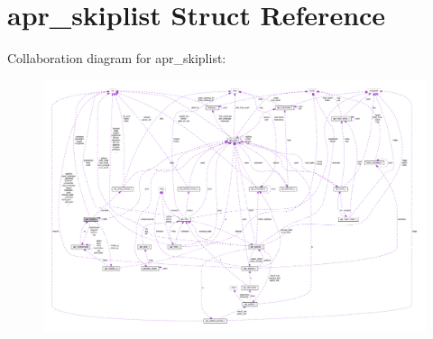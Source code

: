 \hypertarget{structapr__skiplist}{}\section{apr\+\_\+skiplist Struct Reference}
\label{structapr__skiplist}


Collaboration diagram for apr\+\_\+skiplist\+:
\nopagebreak
\begin{figure}[H]
\begin{center}
\leavevmode
\includegraphics[width=350pt]{structapr__skiplist__coll__graph}
\end{center}
\end{figure}
